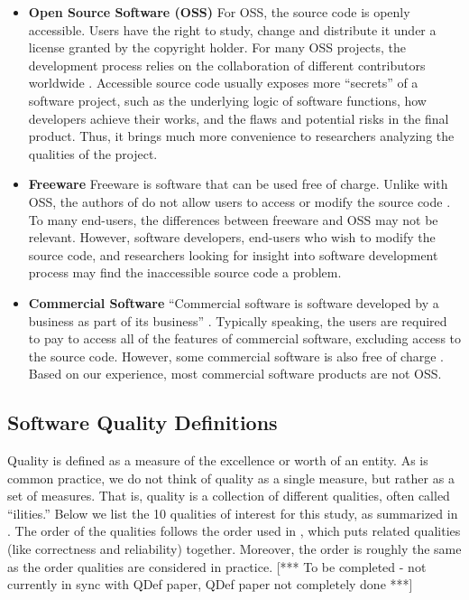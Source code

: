 \documentclass[3p, 12pt,authoryear]{elsarticle}
\begin{document}
\begin{itemize}

\item \textbf{Open Source Software (OSS)} For OSS, the source code is openly
accessible. Users have the right to study, change and distribute it under a
license granted by the copyright holder. For many OSS projects, the development
process relies on the collaboration of different contributors worldwide
\citep{Corbly2014}. Accessible source code usually exposes more ``secrets'' of a
software project, such as the underlying logic of software functions, how
developers achieve their works, and the flaws and potential risks in the final
product. Thus, it brings much more convenience to researchers analyzing the
qualities of the project.

\item \textbf{Freeware} Freeware is software that can be used free of charge.
Unlike with OSS, the authors of do not allow users to access or modify the
source code \citep{LINFO2006}. To many end-users, the differences between
freeware and OSS may not be relevant. However, software developers, end-users
who wish to modify the source code, and researchers looking for insight into
software development process may find the inaccessible source code a problem. 

\item \textbf{Commercial Software} ``Commercial software is software developed
by a business as part of its business'' \citep{GNU2019}. Typically speaking, the
users are required to pay to access all of the features of commercial software,
excluding access to the source code. However, some commercial software is also
free of charge \citep{GNU2019}. Based on our experience, most commercial
software products are not OSS.

\end{itemize}

\subsection{Software Quality Definitions} \label{sec_software_quality}

Quality is defined as a measure of the excellence or worth of an entity.  As is
common practice, we do not think of quality as a single measure, but rather as a
set of measures.  That is, quality is a collection of different qualities, often
called ``ilities.''  Below we list the 10 qualities of interest for this study,
as summarized in \citet{SmithEtAl2021-QDef}.  The order of the qualities follows
the order used in \cite{GhezziEtAl2003}, which puts related qualities (like
correctness and reliability) together.  Moreover, the order is roughly the same
as the order qualities are considered in practice.  [*** To be completed - not
currently in sync with QDef paper, QDef paper not completely done ***]
\end{document}
